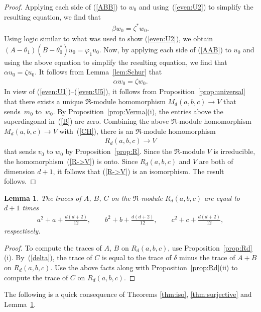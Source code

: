 \documentclass[pdftex]{sigma}
\numberwithin{equation}{section}
\newtheorem{Lemma}[Theorem]{Lemma}
\begin{document}
\begin{proof}
Applying each side of (\ref{ABB}) to $w_0$ and using~(\ref{even:U2}) to simplify the resulting equation, we find that
\begin{gather}\label{even:U4}
\beta w_0=\zeta^* w_0.
\end{gather}
Using logic similar to what was used to show (\ref{even:U2}), we obtain $(A-\theta_1)(B-\theta_0^*)u_0=\varphi_1 u_0$. Now, by applying each side of (\ref{AAB}) to $u_0$ and using the above equation to simplify the resulting equation, we find that $\alpha u_0=\zeta u_0$. It follows from Lemma~\ref{lem:Schur} that
\begin{gather}\label{even:U5}
\alpha w_0=\zeta w_0.
\end{gather}
In view of (\ref{even:U1})--(\ref{even:U5}), it follows from Proposition~\ref{prop:universal} that there exists a unique $\Re$-module homomorphism $M_d(a,b,c)\to V$ that sends~$m_0$ to~$w_0$. By Proposition~\ref{prop:Verma}(i), the entries above the superdiagonal in~(\ref{B}) are zero.
Combining the above $\Re$-module homomorphism \mbox{$M_d(a,b,c)\to V$} with~(\ref{CH}), there is an $\Re$-module homomorphism
\begin{gather}\label{R->V}
R_d(a,b,c)\to V
\end{gather}
that sends $v_0$ to $w_0$ by Proposition~\ref{prop:R}. Since the $\Re$-module $V$ is irreducible, the homomorphism~(\ref{R->V}) is onto. Since $R_d(a,b,c)$ and $V$ are both of dimension $d+1$, it follows that (\ref{R->V}) is an isomorphism. The result follows.
\end{proof}

\begin{Lemma}\label{lem:trace}The traces of $A$, $B$, $C$ on the $\Re$-module $R_d(a,b,c)$ are equal to $d+1$ times
\begin{gather*}
a^2+a+\frac{d(d+2)}{12},
\qquad
b^2+b+\frac{d(d+2)}{12},
\qquad
c^2+c+\frac{d(d+2)}{12},
\end{gather*}
respectively.
\end{Lemma}
\begin{proof}To compute the traces of $A$, $B$ on $R_d(a,b,c)$, use Proposition~\ref{prop:Rd}(i). By~(\ref{delta}), the trace of $C$ is equal to the trace of $\delta$ minus the trace of $A+B$ on $R_d(a,b,c)$. Use the above facts along with Proposition~\ref{prop:Rd}(ii) to compute the trace of $C$ on $R_d(a,b,c)$.
\end{proof}

The following is a quick consequence of Theorems \ref{thm:iso}, \ref{thm:surjective} and Lemma~\ref{lem:trace}.
\end{document}
